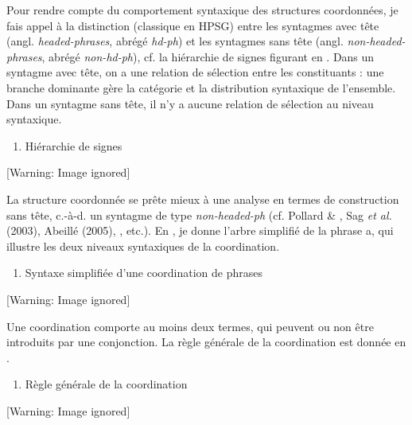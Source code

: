 Pour rendre compte du comportement syntaxique des structures coordonnées, je fais appel à la distinction (classique en HPSG) entre les syntagmes avec tête (angl. \textit{headed-phrases}, abrégé \textit{hd-ph}) et les syntagmes sans tête (angl. \textit{non-headed-phrases}, abrégé \textit{non-hd-ph}), cf. la hiérarchie de signes figurant en . Dans un syntagme avec tête, on a une relation de sélection entre les constituants : une branche dominante gère la catégorie et la distribution syntaxique de l'ensemble. Dans un syntagme sans tête, il n'y a aucune relation de sélection au niveau syntaxique.


\begin{enumerate}
\item \label{bkm:Ref301798760}Hiérarchie de signes


\end{enumerate}
{   [Warning: Image ignored] %
} 

La structure coordonnée se prête mieux à une analyse en termes de construction sans tête, c.-à-d. un syntagme de type \textit{non-headed-ph} (cf. Pollard \& \citet{Sag1994}, Sag \textit{et al.} (2003), Abeillé (2005), \citet{Mouret2007}, etc.). En , je donne l'arbre simplifié de la phrase a, qui illustre les deux niveaux syntaxiques de la coordination. 


\begin{enumerate}
\item \label{bkm:Ref301799331}Syntaxe simplifiée d'une coordination de phrases


\end{enumerate}
{   [Warning: Image ignored] %
} 

Une coordination comporte au moins deux termes, qui peuvent ou non être introduits par une conjonction. La règle générale de la coordination est donnée en .


\begin{enumerate}
\item \label{bkm:Ref301713060}Règle générale de la coordination


\end{enumerate}
  [Warning: Image ignored] %
  

